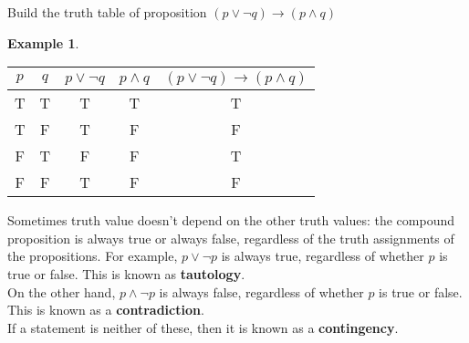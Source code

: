 \documentclass[11pt]{article}
\theoremstyle{definition}
\newtheorem{eg}{Example}
\begin{document}
Build the truth table of proposition $(p \lor \neg q) \rightarrow (p \land q)$
\begin{eg}
 \begin{center}
	\begin{tabular}{ |c|c|c|c|c|} 
 		\hline
 		$p$ & $q$ & $p \lor \neg q$ & $p \land q$ & $(p \lor \neg q) \rightarrow (p \land q)$\\
		\hline
 		T & T  & T & T & T\\
 		T & F & T & F& F\\
		F & T & F & F & T\\
		F & F & T & F & F\\
 		\hline
	\end{tabular}
\end{center}
\end{eg}
Sometimes truth value doesn't depend on the other truth values: the compound proposition is always true or always false, regardless of the truth assignments of the propositions. For example, $p \lor \neg p$ is always true, regardless of whether $p$ is true or false. This is known as \textbf{tautology}. \\

On the other hand, $p \land \neg p$ is always false, regardless of whether $p$ is true or false. This is known as a \textbf{contradiction}. \\

If a statement is neither of these, then it is known as a \textbf{contingency}. 
\end{document}
